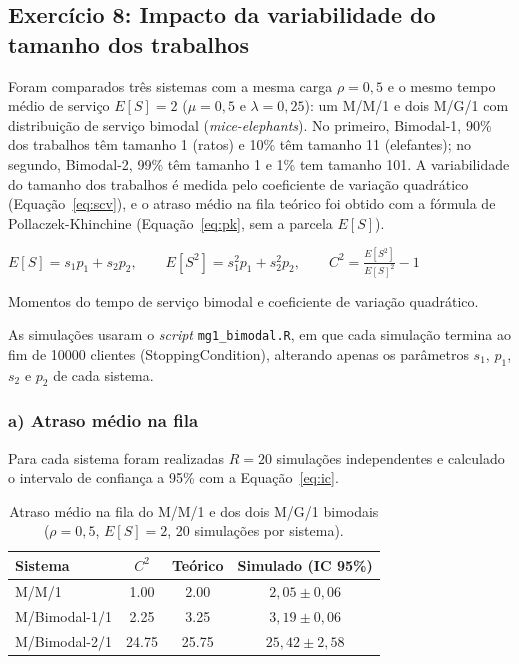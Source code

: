\documentclass[10pt,a4paper]{article}
\newcommand{\formula}[3]{\begin{equacao}[H]\centering$\displaystyle #1$\caption{#2}\label{#3}\end{equacao}}
\begin{document}
\subsection{Exercício 8: Impacto da variabilidade do tamanho dos trabalhos}

Foram comparados três sistemas com a mesma carga $\rho=0{,}5$ e o mesmo tempo médio de serviço $E[S]=2$ ($\mu=0{,}5$ e $\lambda=0{,}25$): um M/M/1 e dois M/G/1 com distribuição de serviço bimodal (\textit{mice-elephants}). No primeiro, Bimodal-1, 90\% dos trabalhos têm tamanho 1 (ratos) e 10\% têm tamanho 11 (elefantes); no segundo, Bimodal-2, 99\% têm tamanho 1 e 1\% tem tamanho 101. A variabilidade do tamanho dos trabalhos é medida pelo coeficiente de variação quadrático (Equação~\ref{eq:scv}), e o atraso médio na fila teórico foi obtido com a fórmula de Pollaczek-Khinchine (Equação~\ref{eq:pk}, sem a parcela $E[S]$).

\formula{E[S]=s_1p_1+s_2p_2,\qquad E[S^2]=s_1^2p_1+s_2^2p_2,\qquad C^2=\frac{E[S^2]}{E[S]^2}-1}{Momentos do tempo de serviço bimodal e coeficiente de variação quadrático.}{eq:scv}

As simulações usaram o \textit{script} \texttt{mg1\_bimodal.R}, em que cada simulação termina ao fim de \num{10000} clientes (StoppingCondition), alterando apenas os parâmetros $s_1$, $p_1$, $s_2$ e $p_2$ de cada sistema.

\subsubsection*{a) Atraso médio na fila}

Para cada sistema foram realizadas $R=20$ simulações independentes e calculado o intervalo de confiança a 95\% com a Equação~\ref{eq:ic}.

\begin{table}[H]
\centering
\begin{tabular}{lS[table-format=2.2]S[table-format=2.2]c}
\toprule
Sistema & {$C^2$} & {Teórico} & {Simulado (IC 95\%)}\\
\midrule
M/M/1 & 1.00 & 2.00 & $2{,}05\pm0{,}06$\\
M/Bimodal-1/1 & 2.25 & 3.25 & $3{,}19\pm0{,}06$\\
M/Bimodal-2/1 & 24.75 & 25.75 & $25{,}42\pm2{,}58$\\
\bottomrule
\end{tabular}
\caption{Atraso médio na fila do M/M/1 e dos dois M/G/1 bimodais ($\rho=0{,}5$, $E[S]=2$, 20 simulações por sistema).}
\label{tab:ex08a}
\end{table}
\end{document}
